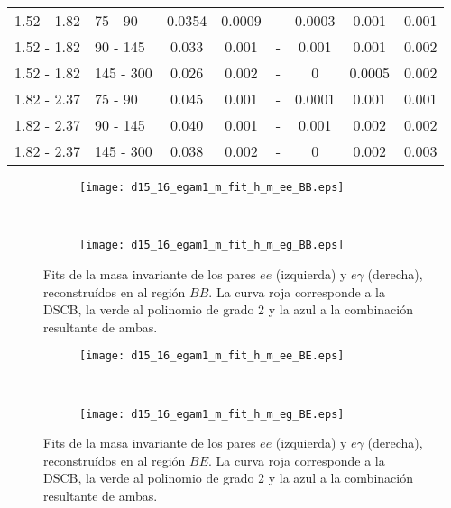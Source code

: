\begin{table}
\begin{threeparttable}
\begin{tabular}{ l l c c c c c c }
	\hline

	1.52 - 1.82 & 75 - 90 & 0.0354  & 0.0009 & -		& 0.0003  &  0.001 &  0.001  \\

	1.52 - 1.82 & 90 - 145 & 0.033  & 0.001 & -		& 0.001  &  0.001  &  0.002 \\

	1.52 - 1.82 & 145 - 300 & 0.026  & 0.002 & -  	& 0  &  0.0005  &  0.002  \\

	\hline

	1.82 - 2.37 & 75 - 90 & 0.045  & 0.001 & -		& 0.0001  &  0.001 &  0.001  \\

	1.82 - 2.37 & 90 - 145 & 0.040  & 0.001 & -		& 0.001  &  0.002  &  0.002  \\

	1.82 - 2.37 & 145 - 300 & 0.038  & 0.002 & -  	& 0  &  0.002  &  0.003  \\

	\hline
	\hline

\end{tabular}
\label{fftable}
\end{threeparttable}
\end{table}


\begin{figure}

	\begin{subfigure}{0.5\textwidth}
		\texttt{[image: d15\_16\_egam1\_m\_fit\_h\_m\_ee\_BB.eps]} 
	\end{subfigure}
	~
	\begin{subfigure}{0.5\textwidth}
		\texttt{[image: d15\_16\_egam1\_m\_fit\_h\_m\_eg\_BB.eps]}
	\end{subfigure}

	
	\caption{Fits de la masa invariante de los pares $ee$ (izquierda) y $e\gamma$ (derecha), reconstruídos en al región $BB$. La curva roja corresponde a la DSCB, la verde al polinomio de grado 2 y la azul a la combinación resultante de ambas.}
\label{fits_BB}
\end{figure}

\begin{figure}

	\begin{subfigure}{0.5\textwidth}
		\texttt{[image: d15\_16\_egam1\_m\_fit\_h\_m\_ee\_BE.eps]} 
	\end{subfigure}
	~
	\begin{subfigure}{0.5\textwidth}
		\texttt{[image: d15\_16\_egam1\_m\_fit\_h\_m\_eg\_BE.eps]}
	\end{subfigure}

	
	\caption{Fits de la masa invariante de los pares $ee$ (izquierda) y $e\gamma$ (derecha), reconstruídos en al región $BE$. La curva roja corresponde a la DSCB, la verde al polinomio de grado 2 y la azul a la combinación resultante de ambas.}
\label{fits_BE}
\end{figure}


